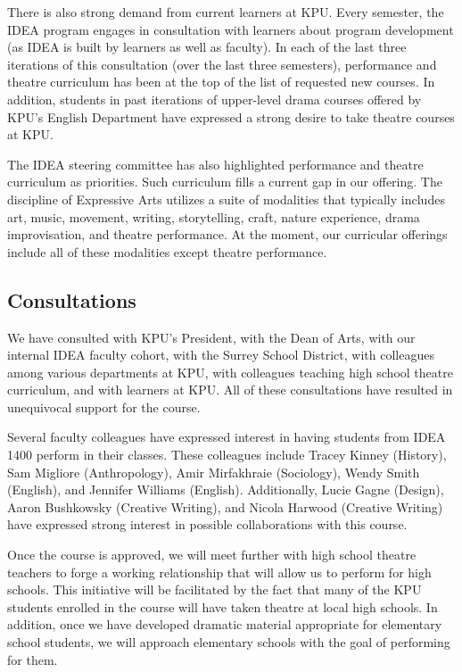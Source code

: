 \documentclass[letterpaper,10pt,headsepline]{scrreprt}
\begin{document}
There is also strong demand from current learners at KPU. Every
semester, the IDEA program engages in consultation with learners about
program development (as IDEA is built by learners as well as faculty).
In each of the last three iterations of this consultation (over the last
three semesters), performance and theatre curriculum has been at the top
of the list of requested new courses. In addition, students in past
iterations of upper-level drama courses offered by KPU's English
Department have expressed a strong desire to take theatre courses at
KPU.

The IDEA steering committee has also highlighted performance and theatre
curriculum as priorities. Such curriculum fills a current gap in our
offering. The discipline of Expressive Arts utilizes a suite of
modalities that typically includes art, music, movement, writing,
storytelling, craft, nature experience, drama improvisation, and theatre
performance. At the moment, our curricular offerings include all of
these modalities except theatre performance.

\subsection{Consultations}

We have consulted with KPU's President, with the Dean of Arts, with our
internal IDEA faculty cohort, with the Surrey School District, with
colleagues among various departments at KPU, with colleagues teaching
high school theatre curriculum, and with learners at KPU. All of these
consultations have resulted in unequivocal support for the course.

Several faculty colleagues have expressed interest in having students
from IDEA 1400 perform in their classes. These colleagues include Tracey
Kinney (History), Sam Migliore (Anthropology), Amir Mirfakhraie
(Sociology), Wendy Smith (English), and Jennifer Williams (English).
Additionally, Lucie Gagne (Design), Aaron Bushkowsky (Creative Writing),
and Nicola Harwood (Creative Writing) have expressed strong interest in
possible collaborations with this course.

Once the course is approved, we will meet further with high school
theatre teachers to forge a working relationship that will allow us to
perform for high schools. This initiative will be facilitated by the
fact that many of the KPU students enrolled in the course will have
taken theatre at local high schools. In addition, once we have developed
dramatic material appropriate for elementary school students, we will
approach elementary schools with the goal of performing for them.
\end{document}
